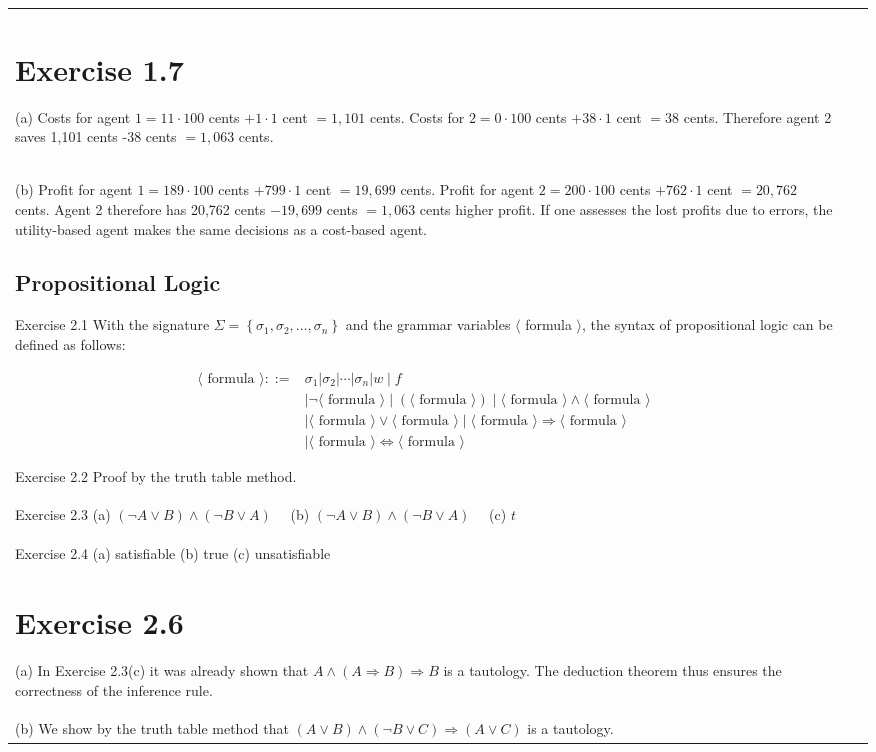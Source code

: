 \documentclass[10pt]{book}
\begin{document}
\begin{center}
\begin{tabular}{|l|l|l|}
\section{Exercise 1.7}
(a) Costs for agent $1=11 \cdot 100$ cents $+1 \cdot 1$ cent $=1,101$ cents. Costs for $2=0 \cdot 100$ cents $+38 \cdot 1$ cent $=38$ cents. Therefore agent 2 saves 1,101 cents -38 cents $=1,063$ cents.\\
(b) Profit for agent $1=189 \cdot 100$ cents $+799 \cdot 1$ cent $=19,699$ cents. Profit for agent $2=200 \cdot 100$ cents $+762 \cdot 1$ cent $=20,762$ cents. Agent 2 therefore has 20,762 cents $-19,699$ cents $=1,063$ cents higher profit. If one assesses the lost profits due to errors, the utility-based agent makes the same decisions as a cost-based agent.

\subsection{Propositional Logic}
Exercise 2.1 With the signature $\Sigma=\left\{\sigma_{1}, \sigma_{2}, \ldots, \sigma_{n}\right\}$ and the grammar variables $\langle$ formula $\rangle$, the syntax of propositional logic can be defined as follows:

$$
\begin{aligned}
\langle\text { formula }\rangle::= & \sigma_{1}\left|\sigma_{2}\right| \cdots\left|\sigma_{n}\right| w \mid f \\
& \mid \neg\langle\text { formula }\rangle \mid(\langle\text { formula }\rangle) \mid\langle\text { formula }\rangle \wedge\langle\text { formula }\rangle \\
& \mid\langle\text { formula }\rangle \vee\langle\text { formula }\rangle \mid\langle\text { formula }\rangle \Rightarrow\langle\text { formula }\rangle \\
& \mid\langle\text { formula }\rangle \Leftrightarrow\langle\text { formula }\rangle
\end{aligned}
$$

Exercise 2.2 Proof by the truth table method.\\
Exercise 2.3 (a) $(\neg A \vee B) \wedge(\neg B \vee A) \quad$ (b) $(\neg A \vee B) \wedge(\neg B \vee A) \quad$ (c) $t$\\
Exercise 2.4 (a) satisfiable (b) true (c) unsatisfiable

\section{Exercise 2.6}
(a) In Exercise 2.3(c) it was already shown that $A \wedge(A \Rightarrow B) \Rightarrow B$ is a tautology. The deduction theorem thus ensures the correctness of the inference rule.\\
(b) We show by the truth table method that $(A \vee B) \wedge(\neg B \vee C) \Rightarrow(A \vee C)$ is a tautology.


\end{tabular}
\end{center}
\end{document}
